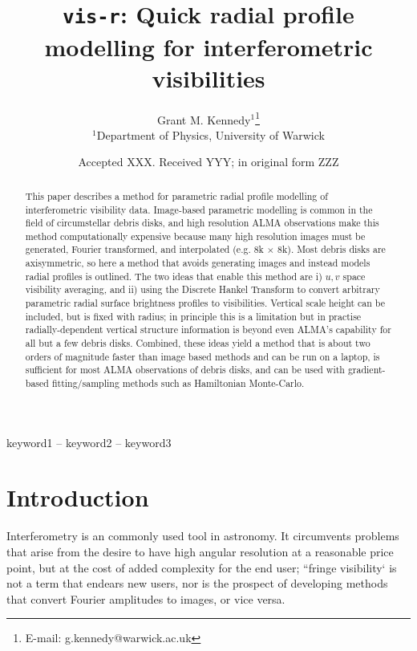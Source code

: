 \documentclass[fleqn,usenatbib]{mnras}
\title[vis-r]{\texttt{vis-r}: Quick radial profile modelling for interferometric visibilities}
\author[G. M. Kennedy]{
Grant M. Kennedy$^{1}$\thanks{E-mail: g.kennedy@warwick.ac.uk}
\\
$^{1}$Department of Physics, University of Warwick
}
\date{Accepted XXX. Received YYY; in original form ZZZ}
\begin{document}
\label{firstpage}
\pagerange{\pageref{firstpage}--\pageref{lastpage}}
\maketitle

\begin{abstract}
This paper describes a method for parametric radial profile modelling of interferometric visibility data. Image-based parametric modelling is common in the field of circumstellar debris disks, and high resolution ALMA observations make this method computationally expensive because many high resolution images must be generated, Fourier transformed, and interpolated (e.g. 8k $\times$ 8k). Most debris disks are axisymmetric, so here a method that avoids generating images and instead models radial profiles is outlined. The two ideas that enable this method are i) $u,v$ space visibility averaging, and ii) using the Discrete Hankel Transform to convert arbitrary parametric radial surface brightness profiles to visibilities. Vertical scale height can be included, but is fixed with radius; in principle this is a limitation but in practise radially-dependent vertical structure information is beyond even ALMA's capability for all but a few debris disks. Combined, these ideas yield a method that is about two orders of magnitude faster than image based methods and can be run on a laptop, is sufficient for most ALMA observations of debris disks, and can be used with gradient-based fitting/sampling methods such as Hamiltonian Monte-Carlo.
\end{abstract}

\begin{keywords}
keyword1 -- keyword2 -- keyword3
\end{keywords}



\section{Introduction}

Interferometry is an commonly used tool in astronomy. It circumvents problems that arise from the desire to have high angular resolution at a reasonable price point, but at the cost of added complexity for the end user; ``fringe visibility` is not a term that endears new users, nor is the prospect of developing methods that convert Fourier amplitudes to images, or vice versa.
\end{document}
